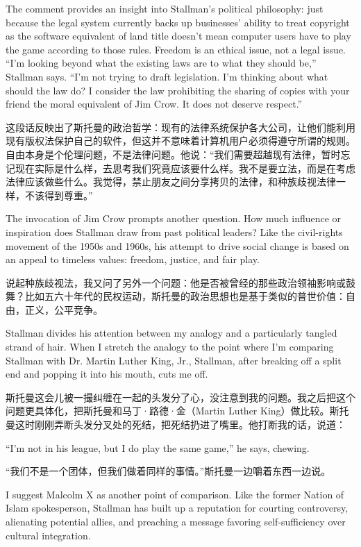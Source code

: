 \ifdefined\eng
The comment provides an insight into Stallman's political philosophy: just because the legal system currently backs up businesses' ability to treat copyright as the software equivalent of land title doesn't mean computer users have to play the game according to those rules. Freedom is an ethical issue, not a legal issue. ``I'm looking beyond what the existing laws are to what they should be,'' Stallman says. ``I'm not trying to draft legislation. I'm thinking about what should the law do? I consider the law prohibiting the sharing of copies with your friend the moral equivalent of Jim Crow. It does not deserve respect.''
\fi

\ifdefined\chs
这段话反映出了斯托曼的政治哲学：现有的法律系统保护各大公司，让他们能利用现有版权法保护自己的软件，但这并不意味着计算机用户必须得遵守所谓的规则。自由本身是个伦理问题，不是法律问题。他说：``我们需要超越现有法律，暂时忘记现在实际是什么样，去思考我们究竟应该要什么样。我不是要立法，而是在考虑法律应该做些什么。我觉得，禁止朋友之间分享拷贝的法律，和种族歧视法律一样，不该得到尊重。''
\fi

\ifdefined\eng
The invocation of Jim Crow prompts another question. How much influence or inspiration does Stallman draw from past political leaders? Like the civil-rights movement of the 1950s and 1960s, his attempt to drive social change is based on an appeal to timeless values: freedom, justice, and fair play.
\fi

\ifdefined\chs
说起种族歧视法，我又问了另外一个问题：他是否被曾经的那些政治领袖影响或鼓舞？比如五六十年代的民权运动，斯托曼的政治思想也是基于类似的普世价值：自由，正义，公平竞争。
\fi

\ifdefined\eng
Stallman divides his attention between my analogy and a particularly tangled strand of hair. When I stretch the analogy to the point where I'm comparing Stallman with Dr. Martin Luther King, Jr., Stallman, after breaking off a split end and popping it into his mouth, cuts me off.
\fi

\ifdefined\chs
斯托曼这会儿被一撮纠缠在一起的头发分了心，没注意到我的问题。我之后把这个问题更具体化，把斯托曼和马丁·路德·金（Martin Luther King）做比较。斯托曼这时刚刚弄断头发分叉处的死结，把死结扔进了嘴里。他打断我的话，说道：
\fi

\ifdefined\eng
``I'm not in his league, but I do play the same game,'' he says, chewing.
\fi

\ifdefined\chs
``我们不是一个团体，但我们做着同样的事情。''斯托曼一边嚼着东西一边说。
\fi

\ifdefined\eng
I suggest Malcolm X as another point of comparison. Like the former Nation of Islam spokesperson, Stallman has built up a reputation for courting controversy, alienating potential allies, and preaching a message favoring self-sufficiency over cultural integration.
\fi

